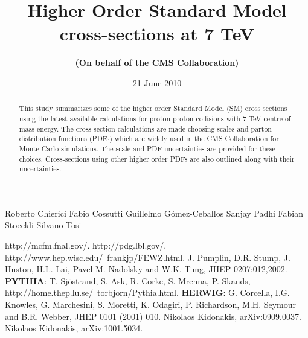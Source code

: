 \documentclass{cmspaper_pdf}
\begin{document}

\begin{titlepage}

  \date{21 June 2010}

  \title{Higher Order Standard Model \\
         cross-sections at 7 TeV}

  \begin{Authlist}
     Roberto Chierici
    Fabio Cossutti 
    Guillelmo G\'omez-Ceballos 
    Sanjay Padhi
    Fabian Stoeckli
    Silvano Tosi

  \end{Authlist}

  \author{\bf(On behalf of the CMS Collaboration)}

  \begin{abstract}
This study summarizes some of the higher order Standard Model (SM) cross sections using the latest 
available calculations for proton-proton collisions with 7 TeV centre-of-mass 
energy. The cross-section calculations are made choosing scales and 
parton distribution functions (PDFs) which are widely used in the CMS Collaboration for Monte 
Carlo simulations. The scale and PDF uncertainties are provided 
for these choices. Cross-sections using other higher order PDFs are also 
outlined along with their uncertainties.
  \end{abstract}

\end{titlepage}

\setcounter{page}{2}%

%






\begin{thebibliography}{9}

http://mcfm.fnal.gov/.
http://pdg.lbl.gov/.
http://www.hep.wisc.edu/~frankjp/FEWZ.html.
 J. Pumplin, D.R. Stump, J. Huston, H.L. Lai, 
Pavel M. Nadolsky and W.K. Tung, JHEP 0207:012,2002. 
 \textbf{PYTHIA}: T. Sj\"ostrand, S. Ask, R. Corke, S. Mrenna, 
P. Skands, http://home.thep.lu.se/~torbjorn/Pythia.html.
 \textbf{HERWIG}: G. Corcella, I.G. Knowles, G. Marchesini, 
S. Moretti, K. Odagiri, P. Richardson, M.H. Seymour and B.R. Webber, 
JHEP 0101 (2001) 010.
 Nikolaos Kidonakis, arXiv:0909.0037.
 Nikolaos Kidonakis, arXiv:1001.5034.
 
\end{thebibliography}
\end{document}
